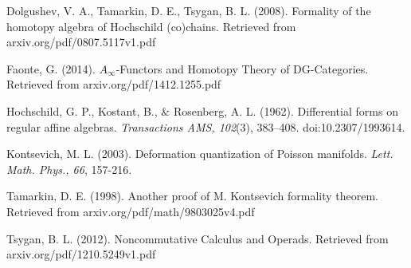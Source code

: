 
% 


\begin{thebibliography}{}

 Dolgushev, V. A., Tamarkin, D. E., Tsygan, B. L. (2008). Formality of the homotopy algebra of Hochschild (co)chains. Retrieved from arxiv.org/pdf/0807.5117v1.pdf

 Faonte, G. (2014). $A_\infty$-Functors and Homotopy Theory of DG-Categories. Retrieved from arxiv.org/pdf/1412.1255.pdf

 Hochschild, G. P., Kostant, B., $\&$ Rosenberg, A. L. (1962). Differential forms on regular affine algebras. \textit{Transactions AMS, 102}(3), 383–408. doi:10.2307/1993614.

 Kontsevich, M. L. (2003). Deformation quantization of Poisson manifolds. \textit{Lett. Math. Phys., 66}, 157-216.

 Tamarkin, D. E. (1998). Another proof of M. Kontsevich formality theorem. Retrieved from arxiv.org/pdf/math/9803025v4.pdf

 Tsygan, B. L. (2012). Noncommutative Calculus and Operads. Retrieved from arxiv.org/pdf/1210.5249v1.pdf

\end{thebibliography}